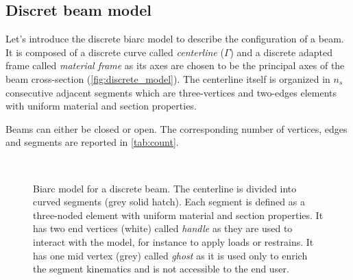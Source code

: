 \subsection{Discret beam model}
Let's introduce the discrete biarc model to describe the configuration of a beam. It is composed of a discrete curve called \emph{centerline} ($\Gamma$) and a discrete adapted frame called \emph{material frame} as its axes are chosen to be the principal axes of the beam cross-section (\cref{fig:discrete_model}). The centerline itself is organized in $n_s$ consecutive adjacent segments which are three-vertices and two-edges elements with uniform material and section properties.

Beams can either be closed or open. The corresponding number of vertices, edges and segments are reported in \cref{tab:count}.
\begin{figure}[p]
\begin{fullpage}
	\captionsetup[subfloat]{captionskip=20pt}
     	\centering
     	 \\
	\vspace{30pt}
	\vspace{10pt}
	\caption{Biarc model for a discrete beam. The centerline is divided into curved segments (grey solid hatch). Each segment is defined as a three-noded element with uniform material and section properties. It has two end vertices (white) called \emph{handle} as they are used to interact with the model, for instance to apply loads or restrains. It has one mid vertex (grey) called \emph{ghost} as it is used only to enrich the segment kinematics and is not accessible to the end user.}
\end{fullpage}
\end{figure}

